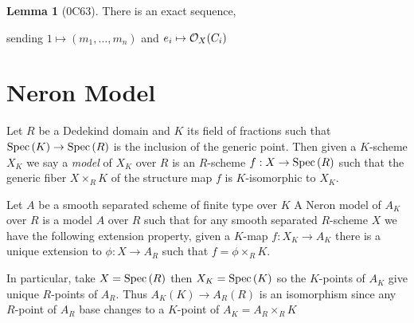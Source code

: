 \documentclass[12pt]{extarticle}
\newcommand{\Z}{\mathbb{Z}}
\theoremstyle{definition}
\newtheorem{lemma}[theorem]{Lemma}
\newenvironment{definition}[1][Definition:]{\begin{trivlist}
\item[\hskip \labelsep {\bfseries #1}]}{\end{trivlist}}
\begin{document}
\begin{lemma}[0C63]
There is an exact sequence,
\begin{center}
\end{center}
sending $1 \mapsto (m_1, \dots, m_n)$ and $e_i \mapsto \mathcal{O}_{X}(C_i)$ 
\end{lemma}

\section{Neron Model}

\begin{definition}
Let $R$ be a Dedekind domain and $K$ its field of fractions such that $\mathrm{Spec}\left(K\right) \to \mathrm{Spec}\left(R\right)$ is the inclusion of the generic point. Then given a $K$-scheme $X_K$ we say a \textit{model} of $X_K$ over $R$ is an $R$-scheme $f : X \to \mathrm{Spec}\left(R\right)$ such that the generic fiber $X \times_R K$ of the structure map $f$ is $K$-isomorphic to $X_K$. 
\end{definition}

\begin{definition}
Let $A$ be a smooth separated scheme of finite type over $K$
A Neron model of $A_K$ over $R$ is a model $A$ over $R$ such that for any smooth separated $R$-scheme $X$ we have the following extension property, given a $K$-map $f : X_K \to A_K$ there is a unique extension to $\phi : X \to A_R$ such that $f = \phi \times_R K$.  
\begin{center}
\end{center}
In particular, take $X = \mathrm{Spec}\left(R\right)$ then $X_K = \mathrm{Spec}\left(K\right)$ so the $K$-points of $A_K$ give unique $R$-points of $A_R$. Thus $A_K(K) \to A_R(R)$ is an isomorphism since any $R$-point of $A_R$ base changes to a $K$-point of $A_K = A_R \times_R K$ 
\end{definition}
\end{document}
